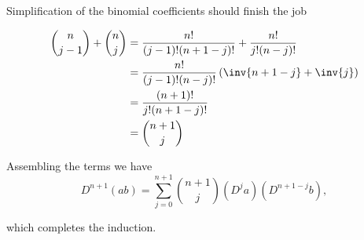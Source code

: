 Simplification of the binomial coefficients should finish the job

\begin{align*}
\binom{n}{j-1} + \binom{n}{j} 
&=
\frac{n!}{(j-1)!(n+1-j)!}
+\frac{n!}{j!(n-j)!} \\
&=
\frac{n!}{(j-1)!(n-j)!} \left( 
\inv{n+1-j} + \inv{j}
\right) \\
&=
\frac{(n+1)!}{j!(n+1-j)!} \\
&=
\binom{n+1}{j}
\end{align*}

Assembling the terms we have
\begin{equation}\label{eqn:productDerivativeInduction:n}
D^{n+1} (a b)
=
\sum_{j=0}^{n+1} \binom{n+1}{j}
(D^{j} a)(D^{n+1-j} b),
\end{equation}

which completes the induction.

\EndNoBibArticle
